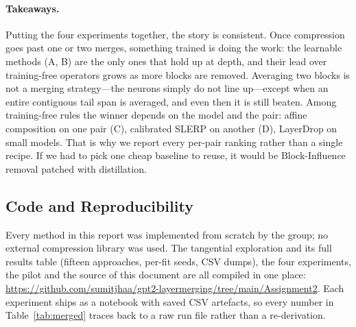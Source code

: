 \documentclass[10pt,a4paper]{article}
\begin{document}
\paragraph{Takeaways.} Putting the four experiments together, the story is
consistent. Once compression goes past one or two merges, something trained is
doing the work: the learnable methods (A, B) are the only ones that hold up at
depth, and their lead over training-free operators grows as more blocks are
removed. Averaging two blocks is not a merging strategy---the neurons simply do
not line up---except when an entire contiguous tail span is averaged, and even
then it is still beaten. Among training-free rules the winner depends on the
model and the pair: affine composition on one pair (C), calibrated SLERP on
another (D), LayerDrop on small models. That is why we report every per-pair
ranking rather than a single recipe. If we had to pick one cheap baseline to
reuse, it would be Block-Influence removal patched with distillation.

\subsection{Code and Reproducibility}
\label{sec:code}

Every method in this report was implemented from scratch by the group; no
external compression library was used. The tangential exploration and its full
results table (fifteen approaches, per-fit seeds, CSV dumps), the four
experiments, the pilot and the source of this document are all compiled in one
place:
\url{https://github.com/sumitjhaa/gpt2-layermerging/tree/main/Assignment2}.
Each experiment ships as a notebook with saved CSV artefacts, so every number
in Table~\ref{tab:merged} traces back to a raw run file rather than a
re-derivation.
\end{document}
